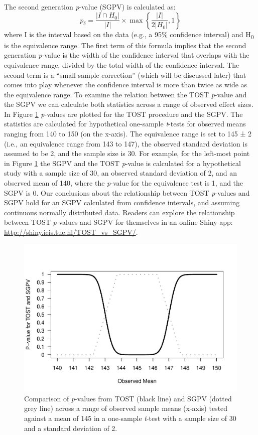 \documentclass[,man,floatsintext]{apa6}
\begin{document}
The second generation \emph{p}-value (SGPV) is calculated as: \[
  p _ { \delta } = \frac { \left| I \cap H _ { 0 } \right| } { | I | } \times \max \left\{ \frac { | I | } { 2 \left| H _ { 0 } \right| } , 1 \right\}
\] where I is the interval based on the data (e.g., a 95\% confidence
interval) and H\textsubscript{0} is the equivalence range. The first
term of this formula implies that the second generation \emph{p}-value
is the width of the confidence interval that overlaps with the
equivalence range, divided by the total width of the confidence
interval. The second term is a \enquote{small sample correction} (which
will be discussed later) that comes into play whenever the confidence
interval is more than twice as wide as the equivalence range. To examine
the relation between the TOST \emph{p}-value and the SGPV we can
calculate both statistics across a range of observed effect sizes. In
Figure \ref{fig:TOSTSGPV1} \emph{p}-values are plotted for the TOST
procedure and the SGPV. The statistics are calculated for hypothetical
one-sample \emph{t}-tests for observed means ranging from 140 to 150 (on
the x-axis). The equivalence range is set to 145 ± 2 (i.e., an
equivalence range from 143 to 147), the observed standard deviation is
assumed to be 2, and the sample size is 30. For example, for the
left-most point in Figure \ref{fig:TOSTSGPV1} the SGPV and the TOST
\emph{p}-value is calculated for a hypothetical study with a sample size
of 30, an observed standard deviation of 2, and an observed mean of 140,
where the \emph{p}-value for the equivalence test is 1, and the SGPV is
0. Our conclusions about the relationship between TOST \emph{p}-values
and SGPV hold for an SGPV calculated from confidence intervals, and
assuming continuous normally distributed data. Readers can explore the
relationship between TOST \emph{p}-values and SGPV for themselves in an
online Shiny app: \url{http://shiny.ieis.tue.nl/TOST_vs_SGPV/}.

\begin{figure}
\centering
\includegraphics{manuscript.R1_files/figure-latex/TOSTSGPV1-1.pdf}
\caption{\label{fig:TOSTSGPV1}Comparison of \emph{p}-values from TOST (black
line) and SGPV (dotted grey line) across a range of observed sample
means (x-axis) tested against a mean of 145 in a one-sample
\emph{t}-test with a sample size of 30 and a standard deviation of 2.}
\end{figure}
\end{document}
